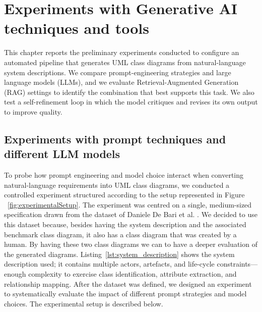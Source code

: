 
%

\chapter{Experiments with Generative AI techniques and tools}
\label{cha:ExperimentsGenerativeAI}

This chapter reports the preliminary experiments conducted to configure an automated pipeline that generates UML class diagrams from natural-language system descriptions. 
We compare prompt-engineering strategies and large language models (LLMs), and we evaluate Retrieval-Augmented Generation (RAG) settings to identify the combination that best supports this task. 
We also test a self-refinement loop in which the model critiques and revises its own output to improve quality. 

\section{Experiments with prompt techniques and different LLM models}
\label{sec:ExperimentPromptModel}
To probe how prompt engineering and model choice interact when converting natural-language requirements into UML class diagrams, we conducted a controlled experiment structured according to the setup represented in Figure ~\ref{fig:experimentalSetup}. The experiment was centred on a single, medium-sized specification drawn from the dataset of Daniele De Bari et al. \cite{DatasetDeBari2024}. 
We decided to use this dataset because, besides having the system description and the associated benchmark class diagram, it also has a class diagram that was created by a human. By having these two class diagrams we can to have a deeper evaluation of the generated diagrams.
Listing~\ref{lst:system_description} shows the system description used; it contains multiple actors, artefacts, and life-cycle constraints—enough complexity to exercise class identification, attribute extraction, and relationship mapping.
After the dataset was defined, we designed an experiment to systematically evaluate the impact of different prompt strategies and model choices. The experimental setup is described below.

